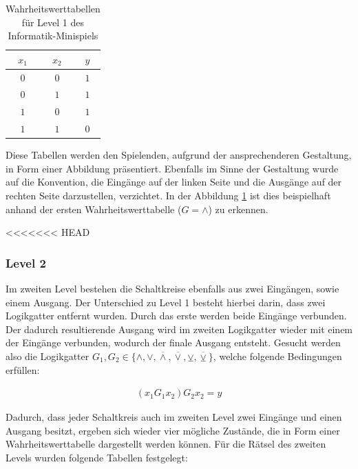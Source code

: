 \begin{table}[h!]
\begin{minipage}{.33\textwidth}
\begin{tabular}{|c|c|c|}
            \hline
            $x_1$ & $x_2$ & $y$ \\
            \hline\hline
            $0$ & $0$ & $1$ \\
            $0$ & $1$ & $1$ \\
            $1$ & $0$ & $1$ \\
            $1$ & $1$ & $0$ \\
            \hline
        \end{tabular}
    \end{minipage}
    \caption{Wahrheitswerttabellen für Level 1 des Informatik-Minispiels}
    \label{tab:wahrheitswerttabellen01}
\end{table}

Diese Tabellen werden den Spielenden, aufgrund der ansprechenderen Gestaltung, in Form einer Abbildung präsentiert.
Ebenfalls im Sinne der Gestaltung wurde auf die Konvention, die Eingänge auf der linken Seite und die Ausgänge auf der rechten Seite darzustellen, verzichtet.
In der Abbildung \ref{tab:wahrheitswerttabellen01} ist dies beispielhaft anhand der ersten Wahrheitswerttabelle ($G = \land$) zu erkennen.

<<<<<<< HEAD
\subsubsection{Level 2}

Im zweiten Level bestehen die Schaltkreise ebenfalls aus zwei Eingängen, sowie einem Ausgang.
Der Unterschied zu Level 1 besteht hierbei darin, dass zwei Logikgatter entfernt wurden.
Durch das erste werden beide Eingänge verbunden.
Der dadurch resultierende Ausgang wird im zweiten Logikgatter wieder mit einem der Eingänge verbunden, wodurch der finale Ausgang entsteht.
Gesucht werden also die Logikgatter $G_1, G_2 \in \{\land , \lor , \overline{\land}, \overline{\lor}, \veebar, \overline{\veebar}\}$, welche folgende Bedingungen erfüllen:

\begin{align*}
    (x_1 G_1 x_2) G_2 x_2 = y
\end{align*}

Dadurch, dass jeder Schaltkreis auch im zweiten Level zwei Eingänge und einen Ausgang besitzt, ergeben sich wieder vier mögliche Zustände, die in Form einer Wahrheitswerttabelle dargestellt werden können.
Für die Rätsel des zweiten Levels wurden folgende Tabellen festgelegt:

